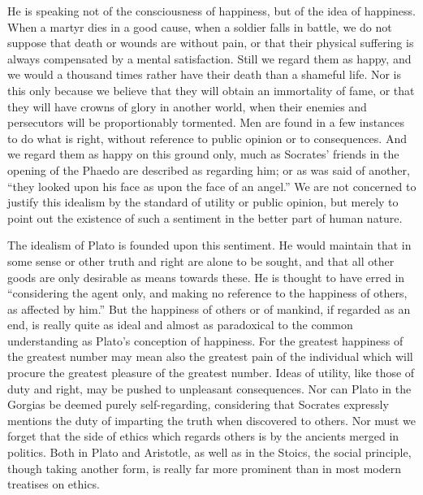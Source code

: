 \documentclass[11pt,letter]{article}
\begin{document}
\par  He is speaking not of the consciousness of happiness, but of the idea of happiness. When a martyr dies in a good cause, when a soldier falls in battle, we do not suppose that death or wounds are without pain, or that their physical suffering is always compensated by a mental satisfaction. Still we regard them as happy, and we would a thousand times rather have their death than a shameful life. Nor is this only because we believe that they will obtain an immortality of fame, or that they will have crowns of glory in another world, when their enemies and persecutors will be proportionably tormented. Men are found in a few instances to do what is right, without reference to public opinion or to consequences. And we regard them as happy on this ground only, much as Socrates’ friends in the opening of the Phaedo are described as regarding him; or as was said of another, “they looked upon his face as upon the face of an angel.” We are not concerned to justify this idealism by the standard of utility or public opinion, but merely to point out the existence of such a sentiment in the better part of human nature.

\par  The idealism of Plato is founded upon this sentiment. He would maintain that in some sense or other truth and right are alone to be sought, and that all other goods are only desirable as means towards these. He is thought to have erred in “considering the agent only, and making no reference to the happiness of others, as affected by him.” But the happiness of others or of mankind, if regarded as an end, is really quite as ideal and almost as paradoxical to the common understanding as Plato’s conception of happiness. For the greatest happiness of the greatest number may mean also the greatest pain of the individual which will procure the greatest pleasure of the greatest number. Ideas of utility, like those of duty and right, may be pushed to unpleasant consequences. Nor can Plato in the Gorgias be deemed purely self-regarding, considering that Socrates expressly mentions the duty of imparting the truth when discovered to others. Nor must we forget that the side of ethics which regards others is by the ancients merged in politics. Both in Plato and Aristotle, as well as in the Stoics, the social principle, though taking another form, is really far more prominent than in most modern treatises on ethics.
\end{document}
